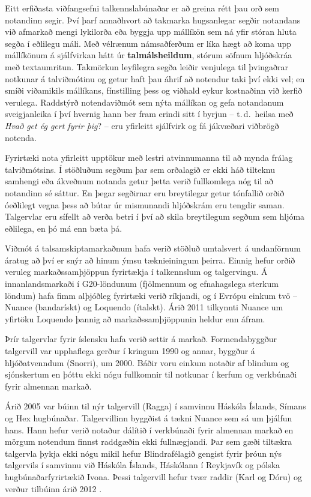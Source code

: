 \begin{multicols}{2}
Eitt erfiðasta viðfangsefni talkennslabúnaðar er að greina rétt þau orð sem notandinn segir. Því þarf annaðhvort að takmarka hugsanlegar segðir notandans við afmarkað mengi lykilorða eða byggja upp mállíkön sem ná yfir stóran hluta segða í eðlilegu máli. Með vélrænum námsaðferðum er líka hægt að koma upp mállíkönum á sjálfvirkan hátt úr \textbf{talmálsheildum}, stórum söfnum hljóðskráa með textaumritun. Takmörkun leyfilegra segða leiðir venjulega til þvingaðrar notkunar á talviðmótinu og getur haft þau áhrif að notendur taki því ekki vel; en smíði viðamikils mállíkans, fínstilling þess og viðhald eykur kostnaðinn við kerfið verulega. Raddstýrð notendaviðmót sem nýta mállíkan og gefa notandanum sveigjanleika í því hvernig hann ber fram erindi sitt í byrjun -- t.\,d.~heilsa með \textit{Hvað get ég gert fyrir þig}? -- eru yfirleitt sjálfvirk og fá jákvæðari viðbrögð notenda.

Fyrirtæki nota yfirleitt upptökur með lestri atvinnumanna til að mynda frálag talviðmótsins. Í stöðluðum segðum þar sem orðalagið er ekki háð tilteknu samhengi eða ákveðnum notanda getur þetta verið fullkomlega nóg til að notandinn sé sáttur. En þegar segðirnar eru breytilegar getur tónfallið orðið óeðlilegt vegna þess að bútar úr mismunandi hljóðskrám eru tengdir saman. Talgervlar eru sífellt að verða betri í því að skila breytilegum segðum sem hljóma eðlilega, en þó má enn bæta þá.

Viðmót á talsamskiptamarkaðnum hafa verið stöðluð umtalsvert á undanförnum áratug að því er snýr að hinum ýmsu tæknieiningum þeirra. Einnig hefur orðið veruleg markaðssamþjöppun fyrirtækja í talkennslum og talgervingu. Á innanlandsmarkaði í G20-löndunum (fjölmennum og efnahagslega sterkum löndum) hafa fimm alþjóðleg fyrirtæki verið ríkjandi, og í Evrópu einkum tvö -- Nuance (bandarískt) og Loquendo (ítalskt). Árið 2011 tilkynnti Nuance um yfirtöku Loquendo þannig að markaðssamþjöppunin heldur enn áfram.

Þrír talgervlar fyrir íslensku hafa verið settir á markað. Formendabyggður talgervill var upphaflega gerður í kringum 1990 og annar, byggður á hljóðatvenndum (Snorri), um 2000. Báðir voru einkum notaðir af blindum og sjónskertum en þóttu ekki nógu fullkomnir til notkunar í kerfum og verkbúnaði fyrir almennan markað. 

Árið 2005 var búinn til nýr talgervill (Ragga) í samvinnu Háskóla Íslands, Símans og Hex hugbúnaðar. Talgervillinn byggðist á tækni Nuance sem sá um þjálfun hans. Hann hefur verið notaður dálítið í verkbúnaði fyrir almennan markað en mörgum notendum finnst raddgæðin ekki fullnægjandi. Þar sem gæði tiltækra talgervla þykja ekki nógu mikil hefur Blindrafélagið gengist fyrir þróun nýs talgervils í samvinnu við Háskóla Íslands, Háskólann í Reykjavík og pólska hugbúnaðarfyrirtækið Ivona. Þessi talgervill hefur tvær raddir (Karl og Dóru) og verður tilbúinn árið 2012 \cite{tal1}.


\end{multicols}
